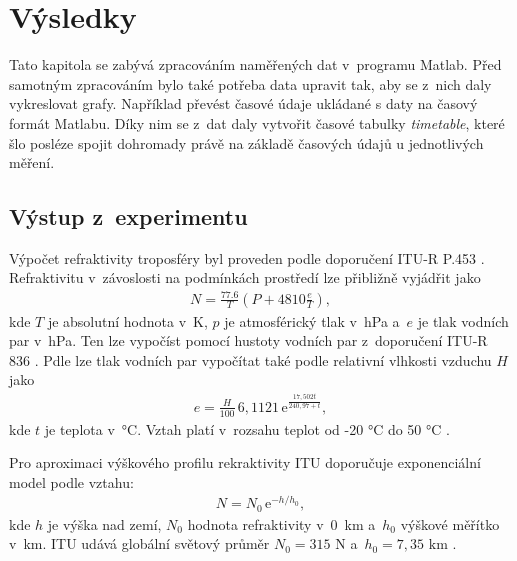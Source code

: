 \documentclass[twoside]{ctuthesis}
\newcommand{\mt}[1]{\text{#1}}
\theoremstyle{plain}
\theoremstyle{definition}
\theoremstyle{note}
\begin{document}
\chapter{Výsledky}
	Tato kapitola se zabývá zpracováním naměřených dat v~programu Matlab. Před samotným zpracováním bylo také potřeba data upravit tak, aby se z~nich daly vykreslovat grafy. Například převést časové údaje ukládané s daty na časový formát Matlabu. Díky nim se z~dat daly vytvořit časové tabulky \textit{timetable}, které šlo posléze spojit dohromady právě na základě časových údajů u jednotlivých měření. 

	\section{Výstup z~experimentu}


	Výpočet refraktivity troposféry byl proveden podle doporučení ITU-R P.453 \cite{ITU:refrac}. Refraktivitu v~závoslosti na podmínkách prostředí lze přibližně vyjádřit jako
	\begin{align}
		N = \frac{77.6}{T} \left(P + 4810\frac{e}{T}\right),
		\label{eq:refr:meas}
	\end{align}
	kde $T$ je absolutní hodnota v~K, $p$ je atmosférický tlak v~hPa a~$e$ je tlak vodních par v~hPa. Ten lze vypočíst pomocí hustoty vodních par z~doporučení ITU-R 836 \cite{ITU:vapour}. Pdle \cite{ITU:refrac} lze tlak vodních par vypočítat také podle relativní vlhkosti vzduchu $H$ jako
	\begin{align}
		e = \frac{H}{100}\,6{,}1121\,\mt{e}^{\frac{17{,}502t}{240{,}97 + t}},
	\end{align}
	kde $t$ je teplota v~°C. Vztah platí v~rozsahu teplot od -20 °C do 50 °C \cite{zaklady:sireni:vln}.

	Pro aproximaci výškového profilu rekraktivity ITU doporučuje \cite{ITU:refrac} exponenciální model podle vztahu:
	\begin{align}
		N = N_\mt{0}\,\mt{e}^{-h/h_\mt{0}},
		\label{eq:refr:approx}
	\end{align}
	kde $h$ je výška nad zemí, $N_\mt{0}$ hodnota refraktivity v~0~km a~$h_\mt{0}$ výškové měřítko v~km. ITU udává globální světový průměr $N_\mt{0} = 315 \mt{ N}$ a~$h_\text{0} = 7{,}35 \mt{ km}$ \cite{zaklady:sireni:vln}.
\end{document}
